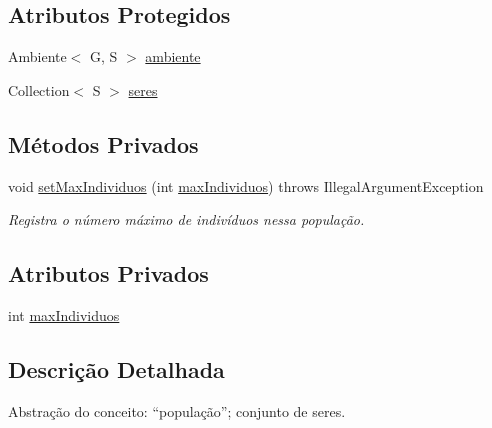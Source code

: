 \subsection*{Atributos Protegidos}
\begin{DoxyCompactItemize}
\item 
Ambiente$<$ G, S $>$ \hyperlink{classic_1_1populacional_1_1_populacao_3_01_g_01extends_01_number_01_6_comparable_3_01_g_01_4_00_506237fa66af7bbd01f529b68d4beaca_a12c7cdc6e608deccb84e397ec9dd43dc}{ambiente}
\item 
Collection$<$ S $>$ \hyperlink{classic_1_1populacional_1_1_populacao_3_01_g_01extends_01_number_01_6_comparable_3_01_g_01_4_00_506237fa66af7bbd01f529b68d4beaca_a95b7dbe0db4e648740672366ee01877f}{seres}
\end{DoxyCompactItemize}
\subsection*{Métodos Privados}
\begin{DoxyCompactItemize}
\item 
void \hyperlink{classic_1_1populacional_1_1_populacao_3_01_g_01extends_01_number_01_6_comparable_3_01_g_01_4_00_506237fa66af7bbd01f529b68d4beaca_a7f44661087d1894747f7bc4c25cb47f6}{set\-Max\-Individuos} (int \hyperlink{classic_1_1populacional_1_1_populacao_3_01_g_01extends_01_number_01_6_comparable_3_01_g_01_4_00_506237fa66af7bbd01f529b68d4beaca_afcdf79ace747a488138db50b05fb21b0}{max\-Individuos})  throws Illegal\-Argument\-Exception 
\begin{DoxyCompactList}\small\item\em Registra o número máximo de indivíduos nessa população. \end{DoxyCompactList}\end{DoxyCompactItemize}
\subsection*{Atributos Privados}
\begin{DoxyCompactItemize}
\item 
int \hyperlink{classic_1_1populacional_1_1_populacao_3_01_g_01extends_01_number_01_6_comparable_3_01_g_01_4_00_506237fa66af7bbd01f529b68d4beaca_afcdf79ace747a488138db50b05fb21b0}{max\-Individuos}
\end{DoxyCompactItemize}


\subsection{Descrição Detalhada}
Abstração do conceito\-: “população”; conjunto de seres. 

